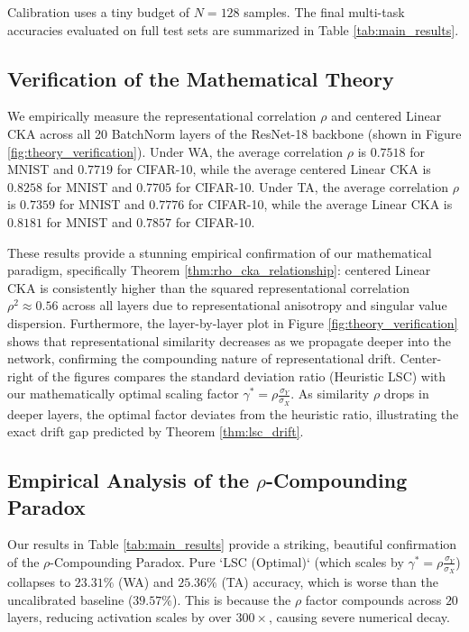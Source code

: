 \documentclass{article}
\theoremstyle{plain}
\theoremstyle{definition}
\theoremstyle{remark}
\begin{document}
Calibration uses a tiny budget of $N = 128$ samples. The final multi-task accuracies evaluated on full test sets are summarized in Table \ref{tab:main_results}.

\subsection{Verification of the Mathematical Theory}
We empirically measure the representational correlation $\rho$ and centered Linear CKA across all 20 BatchNorm layers of the ResNet-18 backbone (shown in Figure \ref{fig:theory_verification}). Under WA, the average correlation $\rho$ is $0.7518$ for MNIST and $0.7719$ for CIFAR-10, while the average centered Linear CKA is $0.8258$ for MNIST and $0.7705$ for CIFAR-10. Under TA, the average correlation $\rho$ is $0.7359$ for MNIST and $0.7776$ for CIFAR-10, while the average Linear CKA is $0.8181$ for MNIST and $0.7857$ for CIFAR-10. 

These results provide a stunning empirical confirmation of our mathematical paradigm, specifically Theorem \ref{thm:rho_cka_relationship}: centered Linear CKA is consistently higher than the squared representational correlation $\rho^2 \approx 0.56$ across all layers due to representational anisotropy and singular value dispersion. Furthermore, the layer-by-layer plot in Figure \ref{fig:theory_verification} shows that representational similarity decreases as we propagate deeper into the network, confirming the compounding nature of representational drift. Center-right of the figures compares the standard deviation ratio (Heuristic LSC) with our mathematically optimal scaling factor $\gamma^* = \rho \frac{\sigma_Y}{\sigma_X}$. As similarity $\rho$ drops in deeper layers, the optimal factor deviates from the heuristic ratio, illustrating the exact drift gap predicted by Theorem \ref{thm:lsc_drift}.

\subsection{Empirical Analysis of the $\rho$-Compounding Paradox}
Our results in Table \ref{tab:main_results} provide a striking, beautiful confirmation of the $\rho$-Compounding Paradox. Pure `LSC (Optimal)` (which scales by $\gamma^* = \rho \frac{\sigma_Y}{\sigma_X}$) collapses to $23.31\%$ (WA) and $25.36\%$ (TA) accuracy, which is worse than the uncalibrated baseline ($39.57\%$). This is because the $\rho$ factor compounds across $20$ layers, reducing activation scales by over $300\times$, causing severe numerical decay.
\end{document}
